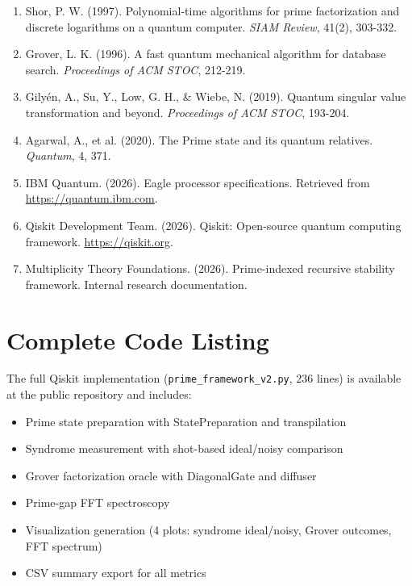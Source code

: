 \documentclass[11pt,letterpaper]{article}
\begin{document}
\begin{enumerate}
\item Shor, P. W. (1997). Polynomial-time algorithms for prime factorization and discrete logarithms on a quantum computer. \textit{SIAM Review}, 41(2), 303-332.

\item Grover, L. K. (1996). A fast quantum mechanical algorithm for database search. \textit{Proceedings of ACM STOC}, 212-219.

\item Gilyén, A., Su, Y., Low, G. H., \& Wiebe, N. (2019). Quantum singular value transformation and beyond. \textit{Proceedings of ACM STOC}, 193-204.

\item Agarwal, A., et al. (2020). The Prime state and its quantum relatives. \textit{Quantum}, 4, 371.

\item IBM Quantum. (2026). Eagle processor specifications. Retrieved from \url{https://quantum.ibm.com}.

\item Qiskit Development Team. (2026). Qiskit: Open-source quantum computing framework. \url{https://qiskit.org}.

\item Multiplicity Theory Foundations. (2026). Prime-indexed recursive stability framework. Internal research documentation.
\end{enumerate}

\appendix

\section{Complete Code Listing}

The full Qiskit implementation (\texttt{prime\_framework\_v2.py}, 236 lines) is available at the public repository and includes:

\begin{itemize}
\item Prime state preparation with StatePreparation and transpilation
\item Syndrome measurement with shot-based ideal/noisy comparison
\item Grover factorization oracle with DiagonalGate and diffuser
\item Prime-gap FFT spectroscopy
\item Visualization generation (4 plots: syndrome ideal/noisy, Grover outcomes, FFT spectrum)
\item CSV summary export for all metrics
\end{itemize}
\end{document}
